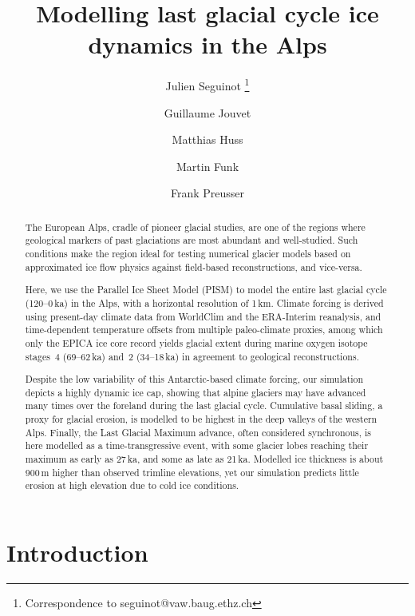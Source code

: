 \documentclass{article}
\title{Modelling last glacial cycle ice dynamics in the Alps}
\author[1]{Julien Seguinot%
           \thanks{Correspondence to seguinot@vaw.baug.ethz.ch}}
\author[1]{Guillaume Jouvet}
\author[1]{Matthias Huss}
\author[1]{Martin Funk}
\author[2]{Frank Preusser}
\affil[1]{Laboratory of Hydraulics, Hydrology and Glaciology,
          ETH Zürich, Switzerland}
\affil[2]{Institute of Earth and Environmental Sciences,
          University of Freiburg, Germany}
\begin{document}

\maketitle

\begin{abstract}

    The European Alps, cradle of pioneer glacial studies, are one of the
    regions where geological markers of past glaciations are most abundant and
    well-studied. Such conditions make the region ideal for testing numerical
    glacier models based on approximated ice flow physics against field-based
    reconstructions, and vice-versa.

    Here, we use the Parallel Ice Sheet Model (PISM) to model the entire last
    glacial cycle (120--0\,ka) in the Alps, with a horizontal resolution of
    1\,km. Climate forcing is derived using present-day climate data from
    WorldClim and the ERA-Interim reanalysis, and time-dependent temperature
    offsets from multiple paleo-climate proxies, among which only the EPICA ice
    core record yields glacial extent during marine oxygen isotope stages~4
    (69--62\,ka) and~2 (34--18\,ka) in agreement to geological reconstructions.

    Despite the low variability of this Antarctic-based climate forcing, our
    simulation depicts a highly dynamic ice cap, showing that alpine glaciers
    may have advanced many times over the foreland during the last glacial
    cycle. Cumulative basal sliding, a proxy for glacial erosion, is modelled
    to be highest in the deep valleys of the western Alps. Finally, the Last
    Glacial Maximum advance, often considered synchronous, is here modelled as
    a time-transgressive event, with some glacier lobes reaching their maximum
    as early as 27\,ka, and some as late as 21\,ka. Modelled ice thickness is
    about 900\,m higher than observed trimline elevations, yet our simulation
    predicts little erosion at high elevation due to cold ice conditions.

\end{abstract}


\section{Introduction}
\end{document}
